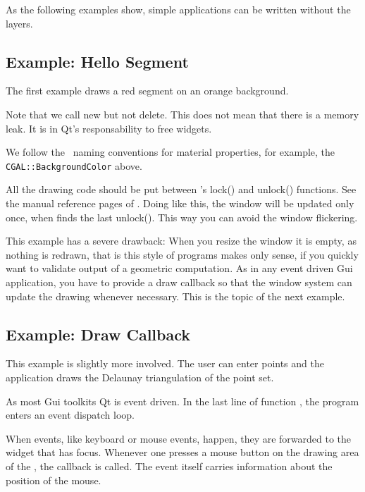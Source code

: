 As the following examples show, simple applications can be written
without the layers.

\subsection{Example: Hello Segment}
The first example draws a red segment on an orange background.

Note that we call new but not delete. This does not mean that there is 
a memory leak. It is in Qt's responsability to free widgets.

We follow the \qt\ naming conventions for material properties, for
example, the {\tt CGAL::BackgroundColor} above.

All the drawing code should be put between 's lock() and
unlock() functions. See the manual reference pages of
. Doing like this, the window will be updated only
once, when  finds the last unlock(). This way you
can avoid the window flickering.

This example has a severe drawback: When you resize the window it is
empty, as nothing is redrawn, that is this style of programs makes
only sense, if you quickly want to validate output of a geometric
computation. As in any event driven {\sc Gui} application, you have to provide 
a draw callback so that the window system can update the drawing
whenever necessary. This is the topic of the next example.

\subsection{Example: Draw Callback}

This example is slightly more involved. The user can enter points and
the application draws the Delaunay triangulation of the point set. 


As most {\sc Gui} toolkits Qt is event driven.  In the last line
of function , the program enters an event dispatch loop.

When events, like keyboard or mouse events, happen, they
are forwarded to the widget that has focus.  Whenever one
presses a mouse button on the drawing area of the ,
the callback  is called.
The event itself carries information about the position of the mouse.

